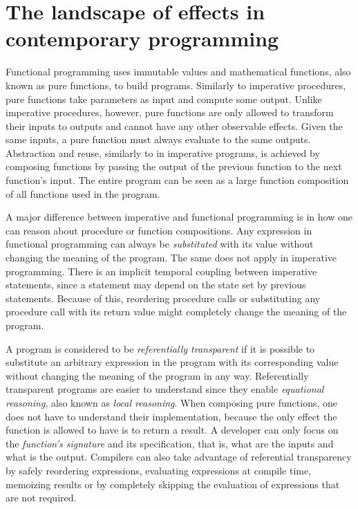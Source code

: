 \chapter{The landscape of effects in contemporary programming}


Functional programming uses immutable values and mathematical functions, also known as pure functions, to build programs. Similarly to imperative procedures, pure functions take parameters as input and compute some output. Unlike imperative procedures, however, pure functions are only allowed to transform their inputs to outputs and cannot have any other observable effects. Given the same inputs, a pure function must always evaluate to the same outputs. Abstraction and reuse, similarly to in imperative programs, is achieved by composing functions by passing the output of the previous function to the next function's input. The entire program can be seen as a large function composition of all functions used in the program.

A major difference between imperative and functional programming is in how one can reason about procedure or function compositions. Any expression in functional programming can always be \textit{substituted} with its value without changing the meaning of the program. The same does not apply in imperative programming. There is an implicit temporal coupling between imperative statements, since a statement may depend on the state set by previous statements. Because of this, reordering procedure calls or substituting any procedure call with its return value might completely change the meaning of the program.~\cite[Chapter~1]{sicp}

A program is considered to be \textit{referentially transparent} if it is possible to substitute an arbitrary expression in the program with its corresponding value without changing the meaning of the program in any way. Referentially transparent programs are easier to understand since they enable \textit{equational reasoning}, also known as \textit{local reasoning}. When composing pure functions, one does not have to understand their implementation, because the only effect the function is allowed to have is to return a result. A developer can only focus on the \textit{function's signature} and its specification, that is, what are the inputs and what is the output. Compilers can also take advantage of referential transparency by safely reordering expressions, evaluating expressions at compile time, memoizing results or by completely skipping the evaluation of expressions that are not required.

